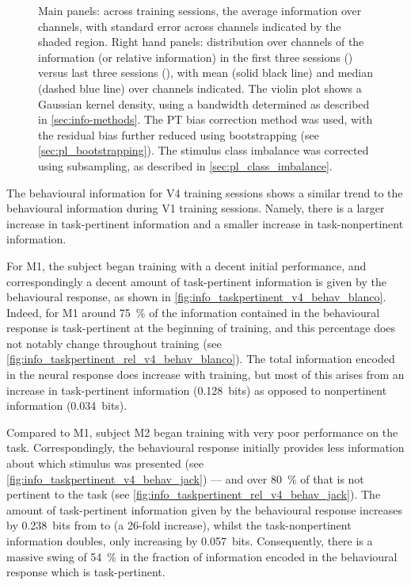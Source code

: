 \begin{figure}[htbp]
{Main panels: across training sessions, the average information over channels, with standard error across channels indicated by the shaded region.
Right hand panels: distribution over channels of the information (or relative information) in the first three sessions () versus last three sessions (), with mean (solid black line) and median (dashed blue line) over channels indicated.
The violin plot shows a Gaussian kernel density, using a bandwidth determined as described in \autoref{sec:info-methods}.
The \ac{PT} bias correction method was used, with the residual bias further reduced using bootstrapping (see \autoref{sec:pl_bootstrapping}).
The stimulus class imbalance was corrected using subsampling, as described in \autoref{sec:pl_class_imbalance}.
    \label{fig:info_taskpertinent_v4_ch}
}
\end{figure}


The behavioural information for \ac{V4} training sessions shows a similar trend to the behavioural information during \ac{V1} training sessions.
Namely, there is a larger increase in task-pertinent information and a smaller increase in task-nonpertinent information.

For \ac{M1}, the subject began training with a decent initial performance, and correspondingly a decent amount of task-pertinent information is given by the behavioural response, as shown in \autoref{fig:info_taskpertinent_v4_behav_blanco}.
Indeed, for \ac{M1} around \SI{75}{\percent} of the information contained in the behavioural response is task-pertinent at the beginning of training, and this percentage does not notably change throughout training (see \autoref{fig:info_taskpertinent_rel_v4_behav_blanco}).
The total information encoded in the neural response does increase with training, but most of this arises from an increase in task-pertinent information (\SI{+0.128}{bits}) as opposed to nonpertinent information (\SI{+0.034}{bits}).

Compared to \ac{M1}, subject \ac{M2} began training with very poor performance on the task.
Correspondingly, the behavioural response initially provides less information about which stimulus was presented (see \autoref{fig:info_taskpertinent_v4_behav_jack}) --- and over \SI{80}{\percent} of that is not pertinent to the task (see \autoref{fig:info_taskpertinent_rel_v4_behav_jack}).
The amount of task-pertinent information given by the behavioural response increases by \SI{0.238}{bits} from  to  (a 26-fold increase), whilst the task-nonpertinent information doubles, only increasing by \SI{0.057}{bits}.
Consequently, there is a massive swing of \SI{+54}{\percent} in the fraction of information encoded in the behavioural response which is task-pertinent.

